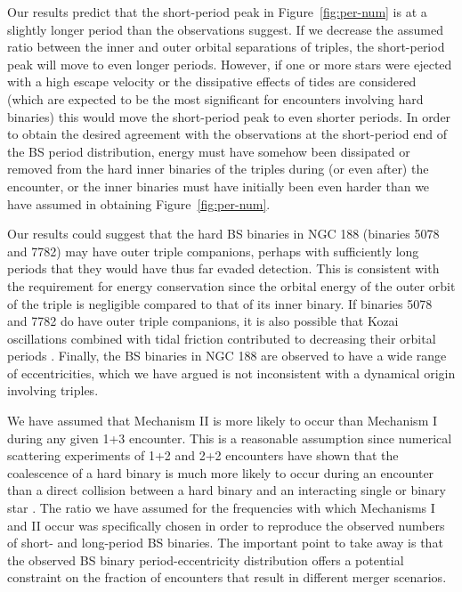 Our results predict that the short-period peak in
Figure~\ref{fig:per-num} is at a slightly longer period than the
observations suggest.  If we decrease the assumed  
ratio between the inner and outer orbital separations of triples, the
short-period peak will move to even longer periods.  However, if one
or more stars were ejected with a high escape velocity or the
dissipative effects of tides are considered (which are expected to be
the most significant for encounters involving hard binaries) this
would move the short-period peak to even shorter periods.  In order to
obtain the desired agreement with the observations at the short-period
end of the BS period distribution, energy must have somehow been
dissipated or removed from the hard inner binaries of the triples
during (or even after) the encounter, or
the inner binaries must have initially been even harder than 
we have assumed in obtaining Figure~\ref{fig:per-num}.  

Our results could suggest that the hard BS binaries in
NGC 188 (binaries 5078 and 7782) may have outer triple companions,
perhaps with sufficiently long periods that they would have thus far
evaded detection.  This is consistent with the requirement for energy
conservation since the orbital energy of the outer
orbit of the triple is negligible compared to that of its inner
binary.  If binaries 5078 and 7782 do have outer triple companions, it
is also possible that Kozai oscillations combined with tidal friction
contributed to decreasing their orbital periods \citep{eggleton06}.
Finally, the BS binaries in NGC 188 are observed 
to have a wide range of eccentricities, which we have argued is
not inconsistent with a dynamical origin involving triples.  

We have assumed that Mechanism II is more likely to occur than
Mechanism I during any given 1+3 encounter.  This is a
reasonable assumption since numerical scattering experiments of 1+2
and 2+2 encounters have shown that the coalescence
of a hard binary is much more likely to occur during an encounter than
a direct collision between a hard binary and an interacting single
or binary star \citep[e.g.][]{fregeau04}.  The ratio we have
assumed for the frequencies with which Mechanisms I and II occur was
specifically chosen in order to reproduce the observed numbers of
short- and
long-period BS binaries.  The important point to take away is that the
observed BS 
binary period-eccentricity distribution offers a potential constraint
on the fraction of encounters that result in different merger
scenarios.  

